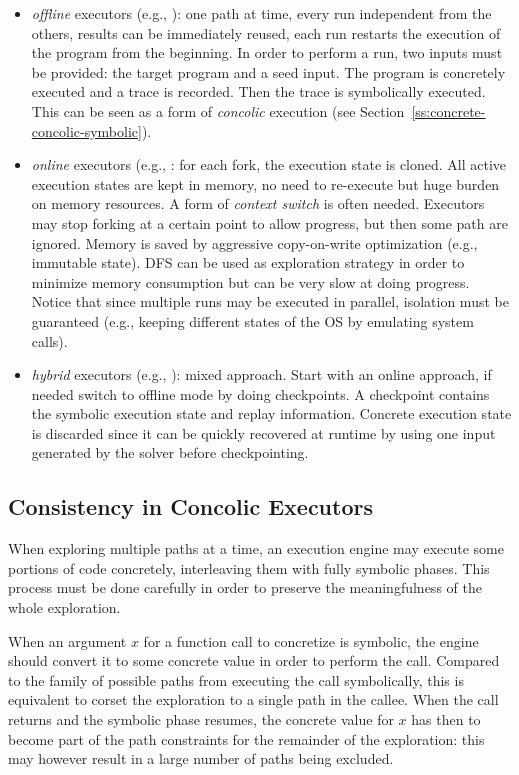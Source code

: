 \begin{itemize}
  \item {\em offline} executors (e.g., \cite{SAGE-NDSS08}): one path at time, every run independent from the others, results can be immediately reused, each run restarts the execution of the program from the beginning. In order to perform a run, two inputs must be provided: the target program and a seed input. The program is concretely executed and a trace is recorded. Then the trace is symbolically executed. This can be seen as a form of {\em concolic} execution (see Section~\ref{ss:concrete-concolic-symbolic}).
  \item {\em online} executors (e.g., \cite{KLEE-OSDI08,CKC-TOCS12,AEG-NDSS11}: for each fork, the execution state is cloned. All active execution states are kept in memory, no need to re-execute but huge burden on memory resources. A form of {\em context switch} is often needed. Executors may stop forking at a certain point to allow progress, but then some path are ignored. Memory is saved by aggressive copy-on-write optimization (e.g., immutable state). DFS can be used as exploration strategy in order to minimize memory consumption but can be very slow at doing progress. Notice that since multiple runs may be executed in parallel, isolation must be guaranteed (e.g., keeping different states of the OS by emulating system calls).
  \item {\em hybrid} executors (e.g., \cite{MAYHEM-SP12}): mixed approach. Start with an online approach, if needed switch to offline mode by doing checkpoints. A checkpoint contains the symbolic execution state and replay information. Concrete execution state is discarded since it can be quickly recovered at runtime by using one input generated by the solver before checkpointing.
\end{itemize}

\subsection{Consistency in Concolic Executors} 

When exploring multiple paths at a time, an execution engine may execute some portions of code concretely, interleaving them with fully symbolic phases. This process must be done carefully in order to preserve the meaningfulness of the whole exploration.

When an argument $x$ for a function call to concretize is symbolic, the engine should convert it to some concrete value in order to perform the call. Compared to the family of possible paths from executing the call symbolically, this is equivalent to corset the exploration to a single path in the callee. When the call returns and the symbolic phase resumes, the concrete value for $x$ has then to become part of the path constraints for the remainder of the exploration: this may however result in a large number of paths being excluded.

